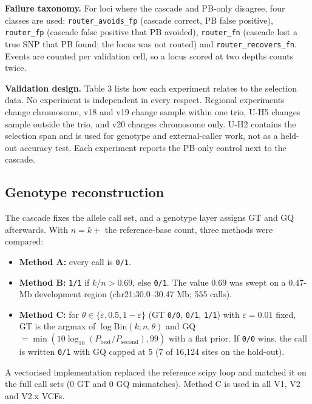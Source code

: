 \documentclass[11pt,a4paper]{article}
\makeatletter
\newcommand{\needspace}[1]{\par\ifdim\pagegoal=\maxdimen\else\dimen@=\pagegoal\advance\dimen@-\pagetotal\ifdim\dimen@<#1\relax\newpage\fi\fi}
\makeatother
\begin{document}
\textbf{Failure taxonomy.} For loci where the cascade and PB-only disagree, four classes are used: \texttt{router\_\allowbreak{}avoids\_\allowbreak{}fp} (cascade correct, PB false positive), \texttt{router\_\allowbreak{}fp} (cascade false positive that PB avoided), \texttt{router\_\allowbreak{}fn} (cascade lost a true SNP that PB found; the locus was not routed) and \texttt{router\_\allowbreak{}recovers\_\allowbreak{}fn}. Events are counted per validation cell, so a locus scored at two depths counts twice.

\textbf{Validation design.} Table 3 lists how each experiment relates to the selection data. No experiment is independent in every respect. Regional experiments change chromosome, v18 and v19 change sample within one trio, U-H5 changes sample outside the trio, and v20 changes chromosome only. U-H2 contains the selection span and is used for genotype and external-caller work, not as a held-out accuracy test. Each experiment reports the PB-only control next to the cascade.

\needspace{6\baselineskip}
\subsection{\texorpdfstring{Genotype reconstruction}{Genotype reconstruction}}
The cascade fixes the allele call set, and a genotype layer assigns GT and GQ afterwards. With $n = k + $ the reference-base count, three methods were compared:

\begin{itemize}[leftmargin=1.6em,itemsep=2pt,topsep=3pt]
\item \textbf{Method A:} every call is \texttt{0/\allowbreak{}1}.
\item \textbf{Method B:} \texttt{1/\allowbreak{}1} if $k/n > 0.69$, else \texttt{0/\allowbreak{}1}. The value 0.69 was swept on a 0.47-Mb development region (chr21:30.0--30.47 Mb; 555 calls).
\item \textbf{Method C:} for $\theta \in \{\varepsilon, 0.5, 1-\varepsilon\}$ (GT \texttt{0/\allowbreak{}0}, \texttt{0/\allowbreak{}1}, \texttt{1/\allowbreak{}1}) with $\varepsilon = 0.01$ fixed, GT is the argmax of $\log\mathrm{Bin}(k;n,\theta)$ and GQ $=\min(10\log_{10}(P_{\text{best}}/P_{\text{second}}), 99)$ with a flat prior. If \texttt{0/\allowbreak{}0} wins, the call is written \texttt{0/\allowbreak{}1} with GQ capped at 5 (7 of 16,124 sites on the hold-out).
\end{itemize}
A vectorised implementation replaced the reference scipy loop and matched it on the full call sets (0 GT and 0 GQ mismatches). Method C is used in all V1, V2 and V2.x VCFs.
\end{document}

